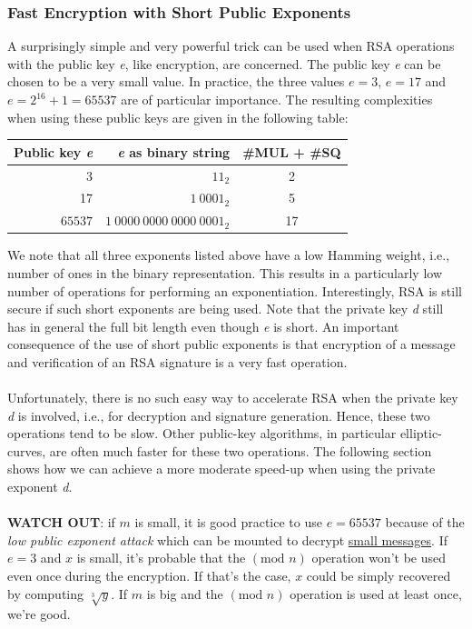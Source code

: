 \documentclass[11pt, a4paper]{article}
\begin{document}
\newpage
\subsubsection{Fast Encryption with Short Public Exponents}
A surprisingly simple and very powerful trick can be used when RSA operations with the public key \textit{e}, like encryption, are concerned. The public key \textit{e} can be chosen to be a very small value. In practice, the three values $e=3$, $e=17$ and $e=2^{16}+1=65537$ are of particular importance. The resulting complexities when using these public keys are given in the following table:
\begin{center}
    \begin{tabular}{|r|r|c|}
        \hline
        Public key \textit{e} & \textit{e} as binary string & \#MUL + \#SQ\\
        \hline
        3 & $11_2$ & 2\\
        17 & $1\ 0001_2$ & 5\\
        $65537$ & $1\ 0000\ 0000\ 0000\ 0001_2$ & 17\\
        \hline
    \end{tabular}
\end{center}
We note that all three exponents listed above have a low Hamming weight, i.e., number of ones in the binary representation. This results in a particularly low number of operations for performing an exponentiation. Interestingly, RSA is still secure if such short exponents are being used. Note that the private key \textit{d} still has in general the full bit length even though \textit{e} is short. An important consequence of the use of short public exponents is that encryption of a message and verification of an RSA signature is a very fast operation.\\\\
Unfortunately, there is no such easy way to accelerate RSA when the private key \textit{d} is involved, i.e., for decryption and signature generation. Hence, these two operations tend to be slow. Other public-key algorithms, in particular elliptic-curves, are often much faster for these two operations. The following section shows how we can achieve a more moderate speed-up when using the private exponent \textit{d}.\\\\
\textbf{WATCH OUT}: if $m$ is small, it is good practice to use $e=65537$ because of the \textit{low public exponent attack} which can be mounted to decrypt \underline{small messages}. If $e=3$ and $x$ is small, it's probable that the $(\text{mod }{n})$ operation won't be used even once during the encryption. If that's the case, $x$ could be simply recovered by computing $\sqrt[3]{y}$. If $m$ is big and the $(\text{mod }{n})$ operation is used at least once, we're good.
\end{document}
